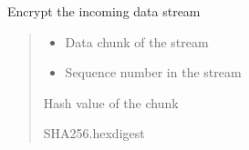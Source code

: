 \documentclass[letterpaper,10pt,english]{sphinxmanual}
\begin{document}
\begin{savenotes}
\begin{fulllineitems}
\begin{savenotes}
\begin{fulllineitems}
\end{fulllineitems}\end{savenotes}


\begin{savenotes}\begin{fulllineitems}
\label{\detokenize{eezz:eezz.filesrv.TEezzFile.encrypt}}
\pysigstartsignatures
{}
\pysigstopsignatures
\sphinxAtStartPar
Encrypt the incoming data stream
\begin{quote}\begin{description}
\begin{itemize}
\item {} 
\sphinxAtStartPar
{} \textendash{} Data chunk of the stream

\item {} 
\sphinxAtStartPar
{} \textendash{} Sequence number in the stream

\end{itemize}

\sphinxAtStartPar
Hash value of the chunk

\sphinxAtStartPar
SHA256.hexdigest

\end{description}\end{quote}

\end{fulllineitems}\end{savenotes}



\end{fulllineitems}
\end{savenotes}
\end{document}
